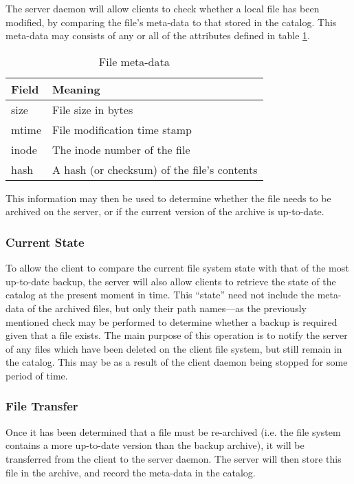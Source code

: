 The server daemon will allow clients to check whether a local file has been
modified, by comparing the file's meta-data to that stored in the catalog. This
meta-data may consists of any or all of the attributes defined in table
\ref{tab:meta-data}.

\begin{table}[h]
    \centering
    \begin{tabular}{| l | l |} \hline
        Field       & Meaning                                       \\ \hline
        size        & File size in bytes                            \\ \hline
        mtime       & File modification time stamp                  \\ \hline
        inode       & The inode number of the file                  \\ \hline
        hash        & A hash (or checksum) of the file's contents   \\ \hline
    \end{tabular}
    \caption{File meta-data}
    \label{tab:meta-data}
\end{table}

This information may then be used to determine whether the file needs to be
archived on the server, or if the current version of the archive is up-to-date.

\subsubsection{Current State}

To allow the client to compare the current file system state with that of the
most up-to-date backup, the server will also allow clients to retrieve the
state of the catalog at the present moment in time. This ``state'' need not
include the meta-data of the archived files, but only their path names---as the
previously mentioned check may be performed to determine whether a backup is
required given that a file exists. The main purpose of this operation is to
notify the server of any files which have been deleted on the client file
system, but still remain in the catalog. This may be as a result of the client
daemon being stopped for some period of time.

\subsubsection{File Transfer}

Once it has been determined that a file must be re-archived (i.e. the file
system contains a more up-to-date version than the backup archive), it will be
transferred from the client to the server daemon. The server will then store
this file in the archive, and record the meta-data in the catalog.

